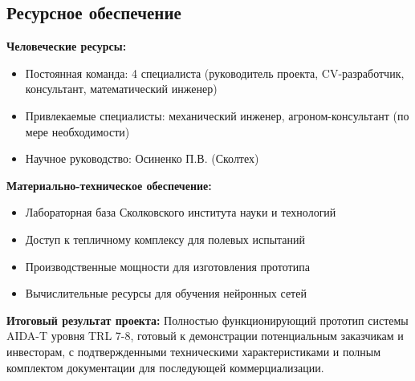 \documentclass[12pt,a4paper]{article}
\begin{document}
\subsection{Ресурсное обеспечение}

\textbf{Человеческие ресурсы:}
\begin{itemize}
    \item Постоянная команда: 4 специалиста (руководитель проекта, CV-разработчик, консультант, математический инженер)
    \item Привлекаемые специалисты: механический инженер, агроном-консультант (по мере необходимости)
    \item Научное руководство: Осиненко П.В. (Сколтех)
\end{itemize}

\textbf{Материально-техническое обеспечение:}
\begin{itemize}
    \item Лабораторная база Сколковского института науки и технологий
    \item Доступ к тепличному комплексу для полевых испытаний
    \item Производственные мощности для изготовления прототипа
    \item Вычислительные ресурсы для обучения нейронных сетей
\end{itemize}

\textbf{Итоговый результат проекта:}
Полностью функционирующий прототип системы AIDA-T уровня TRL 7-8, готовый к демонстрации потенциальным заказчикам и инвесторам, с подтвержденными техническими характеристиками и полным комплектом документации для последующей коммерциализации.
\end{document}
